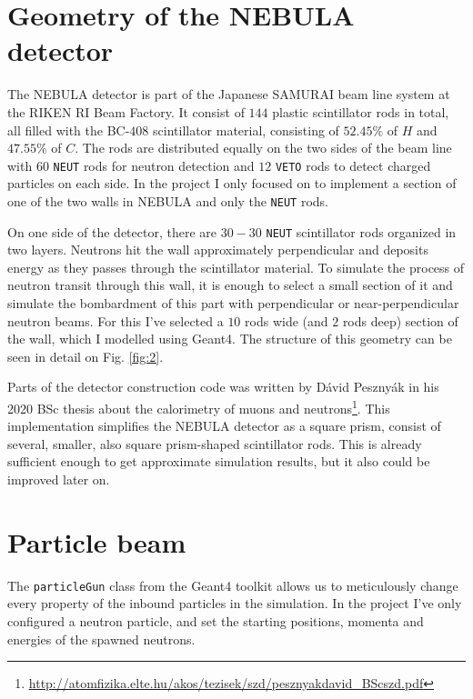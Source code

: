 \begin{multicols}{2}
\section{Geometry of the NEBULA detector} \label{sec:3}
The NEBULA detector is part of the Japanese SAMURAI beam line system at the RIKEN RI Beam Factory. It consist of $144$ plastic scintillator rods in total, all filled with the BC-$408$ scintillator material, consisting of $52.45\%$ of $H$ and $47.55\%$ of $C$. The rods are distributed equally on the two sides of the beam line with $60$ \texttt{NEUT} rods for neutron detection and $12$ \texttt{VETO} rods to detect charged particles on each side. In the project I only focused on to implement a section of one of the two walls in NEBULA and only the \texttt{NEUT} rods.
\begin{Figure}
	\centering
	\captionsetup{justification=centering}
	\texttt{[image: \{images/nebula.png]}}
	\captionof{figure}{The structure of the $20$ rods, $2$ layer section of the NEBULA detector viewed from above in the OpenGL+Qt visualization of the Geant4 simulation.} \label{fig:2}
\end{Figure}
On one side of the detector, there are $30-30$ \texttt{NEUT} scintillator rods organized in two layers. Neutrons hit the wall approximately perpendicular and deposits energy as they passes through the scintillator material. To simulate the process of neutron transit through this wall, it is enough to select a small section of it and simulate the bombardment of this part with perpendicular or near-perpendicular neutron beams. For this I've selected a $10$ rods wide (and $2$ rods deep) section of the wall, which I modelled using Geant4. The structure of this geometry can be seen in detail on Fig. \ref{fig:2}.

Parts of the detector construction code was written by Dávid Pesznyák in his 2020 BSc thesis about the calorimetry of muons and neutrons\footnote{\url{http://atomfizika.elte.hu/akos/tezisek/szd/pesznyakdavid_BScszd.pdf}}. This implementation simplifies the NEBULA detector as a square prism, consist of several, smaller, also square prism-shaped scintillator rods. This is already sufficient enough to get approximate simulation results, but it also could be improved later on.

\section{Particle beam} \label{sec:4}
The \texttt{particleGun} class from the Geant4 toolkit allows us to meticulously change every property of the inbound particles in the simulation. In the project I've only configured a neutron particle, and set the starting positions, momenta and energies of the spawned neutrons.


\end{multicols}
